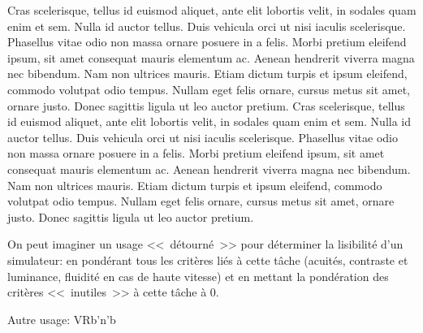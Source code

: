 \par Cras scelerisque, tellus id euismod aliquet, ante elit lobortis velit, in sodales quam enim et sem. Nulla id auctor tellus. Duis vehicula orci ut nisi iaculis scelerisque. Phasellus vitae odio non massa ornare posuere in a felis. Morbi pretium eleifend ipsum, sit amet consequat mauris elementum ac. Aenean hendrerit viverra magna nec bibendum. Nam non ultrices mauris. Etiam dictum turpis et ipsum eleifend, commodo volutpat odio tempus. Nullam eget felis ornare, cursus metus sit amet, ornare justo. Donec sagittis ligula ut leo auctor pretium. Cras scelerisque, tellus id euismod aliquet, ante elit lobortis velit, in sodales quam enim et sem. Nulla id auctor tellus. Duis vehicula orci ut nisi iaculis scelerisque. Phasellus vitae odio non massa ornare posuere in a felis. Morbi pretium eleifend ipsum, sit amet consequat mauris elementum ac. Aenean hendrerit viverra magna nec bibendum. Nam non ultrices mauris. Etiam dictum turpis et ipsum eleifend, commodo volutpat odio tempus. Nullam eget felis ornare, cursus metus sit amet, ornare justo. Donec sagittis ligula ut leo auctor pretium. 

\par On peut imaginer un usage <<~détourné~>> pour déterminer la lisibilité d'un simulateur: en pondérant tous les critères liés à cette tâche (acuités, contraste et luminance, fluidité en cas de  haute vitesse) et en mettant la pondération des critères <<~inutiles~>> à cette tâche à 0.

\par Autre usage: VRb'n'b